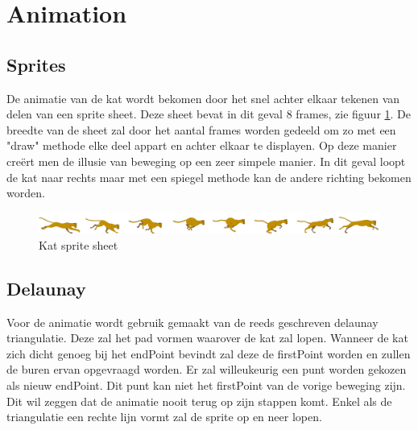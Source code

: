 \section{Animation}


\subsection{Sprites}

De animatie van de kat wordt bekomen door het snel achter elkaar tekenen van delen van een sprite sheet. Deze sheet bevat in dit geval 8 frames, zie figuur \ref{fig:cat}. De breedte van de sheet zal door het aantal frames worden gedeeld om zo met een "draw" methode elke deel appart en achter elkaar te displayen. Op deze manier creërt men de illusie van beweging op een zeer simpele manier. In dit geval loopt de kat naar rechts maar met een spiegel methode kan de andere richting bekomen worden.

\begin{figure}[h]
\centering
\includegraphics[scale=0.3]{img/cat2.png}
\caption{Kat sprite sheet \cite{catsprite}}
\label{fig:cat}
\end{figure}




\subsection{Delaunay}

Voor de animatie wordt gebruik gemaakt van de reeds geschreven delaunay triangulatie. Deze zal het pad vormen waarover de kat zal lopen. Wanneer de kat zich dicht genoeg bij het endPoint bevindt zal deze de firstPoint worden en zullen de buren ervan opgevraagd worden. Er zal willeukeurig een punt worden gekozen als nieuw endPoint. Dit punt kan niet het firstPoint van de vorige beweging zijn. Dit wil zeggen dat de animatie nooit terug op zijn stappen komt. Enkel als de triangulatie een rechte lijn vormt zal de sprite op en neer lopen. 

